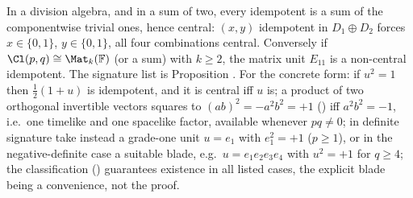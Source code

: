 In a division algebra, and in a sum of two, every idempotent is a sum of the componentwise trivial ones, hence central: $(x,y)$ idempotent in $D_1 \oplus D_2$ forces $x \in \{0,1\}$, $y \in \{0,1\}$, all four combinations central. Conversely if $\Cl(p,q) \cong \Mat_k(\mathbb{F})$ (or a sum) with $k \geq 2$, the matrix unit $E_{11}$ is a non-central idempotent. The signature list is Proposition . For the concrete form: if $u^2 = 1$ then $\tfrac12(1+u)$ is idempotent, and it is central iff $u$ is; a product of two orthogonal invertible vectors squares to $(ab)^2 = -a^2b^2 = +1$ () iff $a^2 b^2 = -1$, i.e.\ one timelike and one spacelike factor, available whenever $pq \neq 0$; in definite signature take instead a grade-one unit $u = e_1$ with $e_1^2 = +1$ ($p \geq 1$), or in the negative-definite case a suitable blade, e.g.\ $u = e_1e_2e_3e_4$ with $u^2 = +1$ for $q \geq 4$; the classification () guarantees existence in all listed cases, the explicit blade being a convenience, not the proof.

